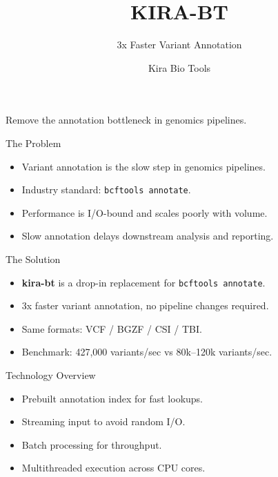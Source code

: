 \documentclass[aspectratio=169]{beamer}
\title[kira-bt]{KIRA-BT}
\subtitle{3x Faster Variant Annotation}
\author{Kira Bio Tools}
\date{}
\begin{document}
\begin{frame}
  \titlepage
  \vspace{0.5em}
  \begin{center}
    \small Remove the annotation bottleneck in genomics pipelines.
  \end{center}
\end{frame}

\begin{frame}{The Problem}
\begin{itemize}
  \item Variant annotation is the slow step in genomics pipelines.
  \item Industry standard: \texttt{bcftools annotate}.
  \item Performance is I/O-bound and scales poorly with volume.
  \item Slow annotation delays downstream analysis and reporting.
\end{itemize}
\end{frame}

\begin{frame}{The Solution}
\begin{itemize}
  \item \textbf{kira-bt} is a drop-in replacement for \texttt{bcftools annotate}.
  \item 3x faster variant annotation, no pipeline changes required.
  \item Same formats: VCF / BGZF / CSI / TBI.
  \item Benchmark: 427,000 variants/sec vs 80k--120k variants/sec.
\end{itemize}
\end{frame}

\begin{frame}{Technology Overview}
\begin{itemize}
  \item Prebuilt annotation index for fast lookups.
  \item Streaming input to avoid random I/O.
  \item Batch processing for throughput.
  \item Multithreaded execution across CPU cores.
\end{itemize}
\end{frame}
\end{document}
